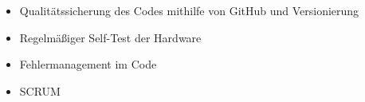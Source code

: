 \begin{itemize}
	\item Qualitätssicherung des Codes mithilfe von GitHub und Versionierung
	\item Regelmäßiger Self-Test der Hardware
	\item Fehlermanagement im Code
	\item SCRUM
	
\end{itemize}